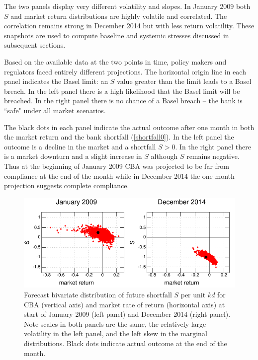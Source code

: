 \documentclass[authoryear]{elsarticle}
\newcommand{\eref}[1]{(\ref{#1})}
\begin{document}
    The two panels  display very different volatility and slopes. In January 2009 both $S$ and market return distributions are highly volatile and correlated. The correlation remains strong in December 2014 but with less return volatility. These snapshots are used to compute baseline and systemic stresses discussed in subsequent sections.

Based on the available data at the two points in  time, policy makers and regulators faced entirely different projections.      The  horizontal origin line in each panel indicates the Basel limit:  an $S$ value greater than the limit leads to a Basel breach.   In the left panel there is a high likelihood that the Basel limit will be breached.  In the right panel there is no chance of a Basel breach -- the bank is ``safe" under all market scenarios.

 The black dots in each panel indicate the actual outcome after one month in both the market return and the bank shortfall \eref{shortfall0}.    In the left panel the outcome is a decline in   the market and  a shortfall $S>0$.    In the right panel there is a market downturn and a slight  increase in $S$ although $S$ remains negative.    Thus at the beginning of January  2009 CBA was projected to be far from compliance at the end of the  month while in December 2014 the one month projection suggests complete compliance.

\begin{figure}[htbp]
\begin{center}
\includegraphics{figures/figCBA.pdf}
\caption{Forecast bivariate distribution of future shortfall $S$ per unit $kd$  for CBA (vertical axis) and market rate of return (horizontal axis) at start of January 2009 (left panel)  and December 2014 (right panel). Note scales in both panels are the same, the relatively large volatility in the left panel, and the left skew in the  marginal distributions.  Black dots indicate actual  outcome at the end of the month.}\label{figCBA}
\end{center}
\end{figure}
\end{document}
